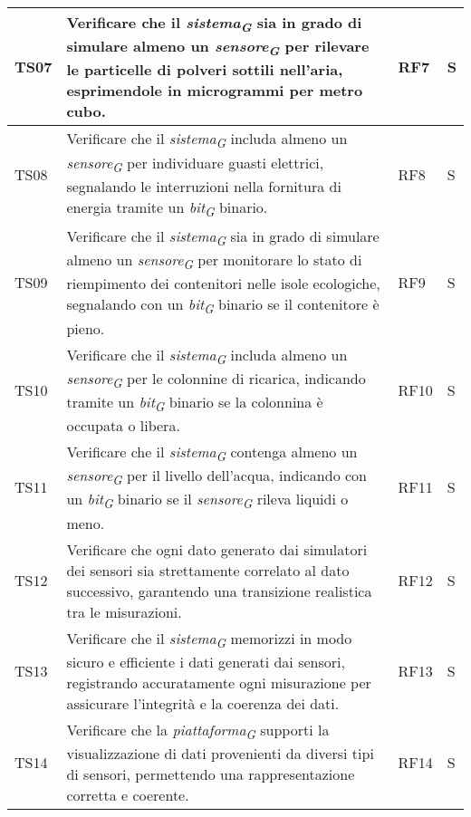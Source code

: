 \begin{longtable}{|C{1.9cm}|L{5cm}|C{2cm}|C{2cm}|}
    TS07 & Verificare che il \textit{sistema}\textsubscript{\textit{G}} sia in grado di simulare almeno un \textit{sensore}\textsubscript{\textit{G}} per rilevare le particelle di polveri sottili nell'aria, esprimendole in microgrammi per metro cubo. & RF7 & S \\
    \hline

    TS08 & Verificare che il \textit{sistema}\textsubscript{\textit{G}} includa almeno un \textit{sensore}\textsubscript{\textit{G}} per individuare guasti elettrici, segnalando le interruzioni nella fornitura di energia tramite un \textit{bit}\textsubscript{\textit{G}} binario. & RF8 & S \\
    \hline

    TS09 & Verificare che il \textit{sistema}\textsubscript{\textit{G}} sia in grado di simulare almeno un \textit{sensore}\textsubscript{\textit{G}} per monitorare lo stato di riempimento dei contenitori nelle isole ecologiche, segnalando con un \textit{bit}\textsubscript{\textit{G}} binario se il contenitore è pieno. & RF9 & S \\
    \hline

    TS10 & Verificare che il \textit{sistema}\textsubscript{\textit{G}} includa almeno un \textit{sensore}\textsubscript{\textit{G}} per le colonnine di ricarica, indicando tramite un \textit{bit}\textsubscript{\textit{G}} binario se la colonnina è occupata o libera. & RF10 & S \\
    \hline

    TS11 & Verificare che il \textit{sistema}\textsubscript{\textit{G}} contenga almeno un \textit{sensore}\textsubscript{\textit{G}} per il livello dell'acqua, indicando con un \textit{bit}\textsubscript{\textit{G}} binario se il \textit{sensore}\textsubscript{\textit{G}} rileva liquidi o meno. & RF11 & S \\
    \hline

    TS12 & Verificare che ogni dato generato dai simulatori dei sensori sia strettamente correlato al dato successivo, garantendo una transizione realistica tra le misurazioni. & RF12 & S \\
    \hline

    TS13 & Verificare che il \textit{sistema}\textsubscript{\textit{G}} memorizzi in modo sicuro e efficiente i dati generati dai sensori, registrando accuratamente ogni misurazione per assicurare l'integrità e la coerenza dei dati. & RF13 & S \\
    \hline

    TS14 & Verificare che la \textit{piattaforma}\textsubscript{\textit{G}} supporti la visualizzazione di dati provenienti da diversi tipi di sensori, permettendo una rappresentazione corretta e coerente. & RF14 & S \\
    \hline


\end{longtable}
